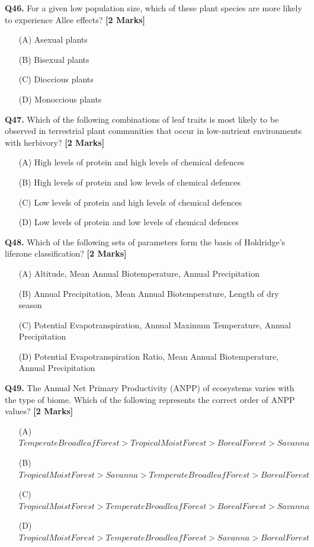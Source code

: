 \documentclass[11pt]{article}
\newcommand{\questionb}[2]{
    \noindent\textbf{Q#2.} #1 \hfill \textbf{[2 Marks]}
}
\begin{document}
\questionb{For a given low population size, which of these plant species are more likely to experience Allee effects?}{46}
\begin{enumerate}
    \item[(A)] Asexual plants  
    \item[(B)] Bisexual plants  
    \item[(C)] Dioccious plants  
    \item[(D)] Monoccious plants  
\end{enumerate}
\vspace{0.5cm}

\questionb{Which of the following combinations of leaf traits is most likely to be observed in terrestrial plant communities that occur in low-nutrient environments with herbivory?}{47}
\begin{enumerate}
    \item[(A)] High levels of protein and high levels of chemical defences  
    \item[(B)] High levels of protein and low levels of chemical defences  
    \item[(C)] Low levels of protein and high levels of chemical defences  
    \item[(D)] Low levels of protein and low levels of chemical defences  
\end{enumerate}
\vspace{0.5cm}

\questionb{Which of the following sets of parameters form the basis of Holdridge's lifezone classification?}{48}
\begin{enumerate}
    \item[(A)] Altitude, Mean Annual Biotemperature, Annual Precipitation  
    \item[(B)] Annual Precipitation, Mean Annual Biotemperature, Length of dry season  
    \item[(C)] Potential Evapotranspiration, Annual Maximum Temperature, Annual Precipitation  
    \item[(D)] Potential Evapotranspiration Ratio, Mean Annual Biotemperature, Annual Precipitation  
\end{enumerate}
\vspace{0.5cm}

\questionb{The Annual Net Primary Productivity (ANPP) of ecosystems varies with the type of biome. Which of the following represents the correct order of ANPP values?}{49}
\begin{enumerate}
    \item[(A)] $Temperate Broadleaf Forest > Tropical Moist Forest > Boreal Forest > Savanna  $
    \item[(B)] $Tropical Moist Forest > Savanna > Temperate Broadleaf Forest > Boreal Forest$  
    \item[(C)] $Tropical Moist Forest > Temperate Broadleaf Forest > Boreal Forest > Savanna$  
    \item[(D)] $Tropical Moist Forest > Temperate Broadleaf Forest > Savanna > Boreal Forest$  
\end{enumerate}
\vspace{0.5cm}
\end{document}
